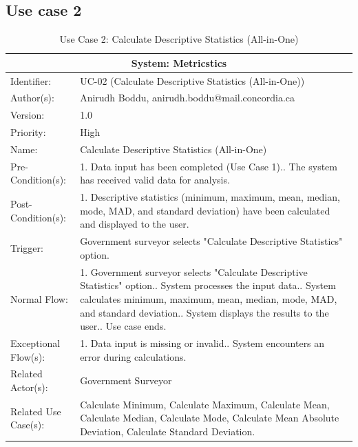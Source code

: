 
\begin{table}[h]
\subsection*{Use case 2}
\begin{tabular}{ | p{4cm} | p{10cm} | }
 \hline
 \multicolumn{2}{|c|}{System: Metricstics} \\
 \hline
 Identifier: & UC-02 (Calculate Descriptive Statistics (All-in-One)) \\
 \hline
 Author(s): & Anirudh Boddu, anirudh.boddu@mail.concordia.ca  \\
 \hline
 Version: & 1.0	\\
 \hline
 Priority: & High	\\
 \hline
 Name: & Calculate Descriptive Statistics (All-in-One)	 \\
 \hline
 Pre-Condition(s):  & {1. Data input has been completed (Use Case 1).\newline 2. The system has received valid data for analysis.}\\
 \hline
 Post-Condition(s):  & {1. Descriptive statistics (minimum, maximum, mean, median, mode, MAD, and standard deviation) have been calculated and displayed to the user.}\\
 \hline
 Trigger: & Government surveyor selects "Calculate Descriptive Statistics" option. \\
 \hline
 Normal Flow:  & {1. Government surveyor selects "Calculate Descriptive Statistics" option.\newline 2. System processes the input data.\newline 3. System calculates minimum, maximum, mean, median, mode, MAD, and standard deviation.\newline 4. System displays the results to the user.\newline 5. Use case ends.}\\
 \hline
 Exceptional Flow(s):  & {1. Data input is missing or invalid.\newline 2. System encounters an error during calculations.}\\
 \hline
 Related Actor(s): & Government Surveyor\\
 \hline
 Related Use Case(s): & Calculate Minimum, Calculate Maximum, Calculate Mean, Calculate Median, Calculate Mode, Calculate Mean Absolute Deviation, Calculate Standard Deviation.\\
 \hline
 \end{tabular}
\renewcommand{\thetable}{\arabic{table}}
\caption{Use Case 2: Calculate Descriptive Statistics (All-in-One)}
\label{tab:table1}
\end{table}

